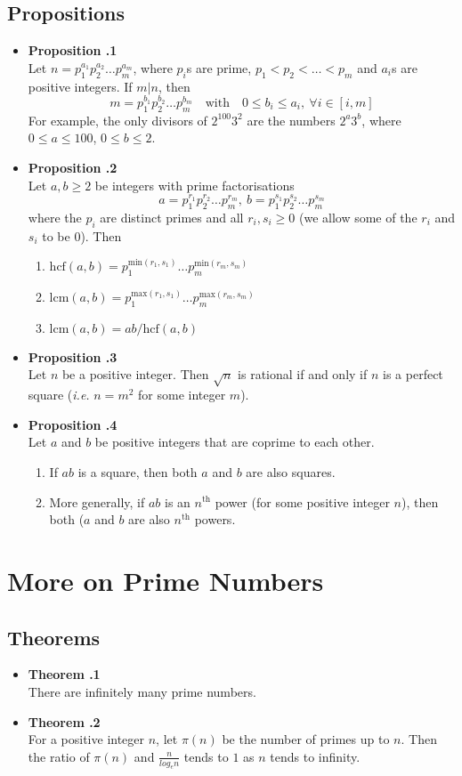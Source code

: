 \documentclass[a4paper,12pt]{article}
\newcommand{\prop}[1]{
    \item \textbf{Proposition \thesection.#1}\\
}
\newcommand{\theo}[1]{
    \item \textbf{Theorem \thesection.#1}\\
}
\begin{document}
\subsection{Propositions}
\begin{itemize}
    \prop 1
    Let $n = p_1^{a_1}p_2^{a_2} \ldots p_m^{a_m}$, where $p_i$s are prime,
    $p_1 < p_2 < \ldots < p_m$ and $a_i$s are positive integers. If $m|n$,
    then
        $$ m = p_1^{b_1}p_2^{b_2} \ldots p_m^{b_m} \quad \text{with} \quad 0 \le b_i \le a_i, \  \forall i \in [i, m] $$
    For example, the only divisors of $2^100 3^2$ are the numbers $2^a 3^b$,
    where $0 \le a \le 100$, $0 \le b \le 2$.
    
    \prop 2
     Let $a, b \ge 2$ be integers with prime factorisations
        $$ a = p_1^{r_1}p_2^{r_2} \ldots p_m^{r_m},\  b = p_1^{s_1}p_2^{s_2} \ldots p_m^{s_m} $$
    where the $p_i$ are distinct primes and all $r_i, s_i \ge 0$ (we allow some
    of the $r_i$ and $s_i$ to be $0$). Then
    \begin{enumerate}
        \item $\text{hcf}(a, b) = p_1^{\text{min}(r_1, s_1)} \ldots p_m^{\text{min}(r_m, s_m)}$
        \item $\text{lcm}(a, b) = p_1^{\text{max}(r_1, s_1)} \ldots p_m^{\text{max}(r_m, s_m)}$
        \item $\text{lcm}(a, b) = ab/\text{hcf}(a, b)$
    \end{enumerate}
        
    \prop 3
    Let $n$ be a positive integer. Then $\sqrt{n}$ is rational if and only if $n$
    is a perfect square (\textit{i.e.} $n = m^2$ for some integer $m$).
    
    \prop 4
    Let $a$ and $b$ be positive integers that are coprime to each other.
    \begin{enumerate}
        \item If $ab$ is a square, then both $a$ and $b$ are also squares.
        \item More generally, if $ab$ is an $n^\text{th}$ power (for some
            positive integer $n$), then both ($a$ and $b$ are also
            $n^\text{th}$ powers.
    \end{enumerate}
\end{itemize}

\section{More on Prime Numbers}
\subsection{Theorems}
\begin{itemize}
    \theo 1
    There are infinitely many prime numbers.
    
    \theo 2
    For a positive integer $n$, let $\pi(n)$ be the number of primes up to $n$.
    Then the ratio of $\pi(n)$ and $\frac{n}{log_e n}$ tends to $1$ as $n$
    tends to infinity.
\end{itemize}
\end{document}
